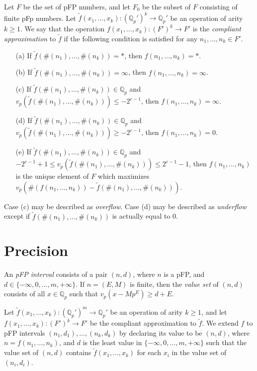 \documentclass[12pt]{article}
\def\QQ{\mathbb{Q}}
\begin{document}
Let $F$ be the set of pFP numbers, and
let $F_0$ be the subset of $F$ consisting of finite pFp numbers.
Let $\tilde{f}(x_1,\dots,x_k): 
(\QQ_p')^k \to \QQ_p'$ be
an operation of arity $k \geq 1$. We say that the operation
$f(x_1,\dots,x_k): (F')^k \to F'$ is the \emph{compliant
approximation} to $\tilde{f}$ if the following condition
is satisfied for any $n_1,\dots,n_k \in F'$.
\begin{enumerate}
\item[(a)]
If $\tilde{f}(\#(n_1), \dots, \#(n_k)) = *$, then
$f(n_1,\dots,n_k) = *$.
\item[(b)]
If $\tilde{f}(\#(n_1), \dots, \#(n_k)) = \infty$, then
$f(n_1,\dots,n_k) = \infty$.
\item[(c)]
If $\tilde{f}(\#(n_1), \dots, \#(n_k)) \in \QQ_p$
and $v_p(\tilde{f}(\#(n_1), \dots, \#(n_k))) \leq -2^{e-1}$,
then $f(n_1,\dots,n_k) = \infty$.
\item[(d)]
If $\tilde{f}(\#(n_1), \dots, \#(n_k)) \in \QQ_p$
and $v_p(\tilde{f}(\#(n_1), \dots, \#(n_k))) \geq -2^{e-1}$,
then $f(n_1,\dots,n_k) = 0$.
\item[(e)]
If $\tilde{f}(\#(n_1), \dots, \#(n_k)) \in \QQ_p$
and $-2^{e-1} + 1 \leq v_p(\tilde{f}(\#(n_1), \dots, \#(n_k))) \leq 2^{e-1}-1$,
then $f(n_1,\dots,n_k)$
is the unique element of $F$ which maximizes
$v_p(\#(f(n_1,\dots,n_k)) - \tilde{f}(\#(n_1), \dots, \#(n_k)))$.
\end{enumerate}

Case (c) may be described as \emph{overflow}. Case (d) may be 
described as \emph{underflow} except if
$\tilde{f}(\#(n_1), \dots, \#(n_k))$ is actually equal to 0.

\section{Precision}

An \emph{pFP interval} consists of a pair $(n, d)$, where $n$ is a pFP,
and $d \in \{-\infty, 0, \dots, m, +\infty\}$. If $n = (E,M)$ 
is finite, then the
\emph{value set} of $(n,d)$ consists of all $x \in \QQ_p$ such that
$v_p(x - Mp^E) \geq d + E$.

Let $\tilde{f}(x_1,\dots,x_k): 
(\QQ_p')^m \to \QQ_p'$ be
an operation of arity $k \geq 1$, and let 
$f(x_1,\dots,x_k): (F')^k \to F'$ be the compliant
approximation to $\tilde{f}$.
We extend $f$ to pFP intervals $(n_1,d_1),\dots,(n_k,d_k)$ 
by declaring its value to be $(n,d)$, where
$n = f(n_1,\dots,n_k)$, and $d$ is the least value in 
$\{-\infty,0,\dots,m,+\infty\}$ such that the value set of $(n,d)$ contains 
$\tilde{f}(x_1,\dots,x_k)$ for each $x_i$ in the value set of $(n_i,d_i)$.
\end{document}
